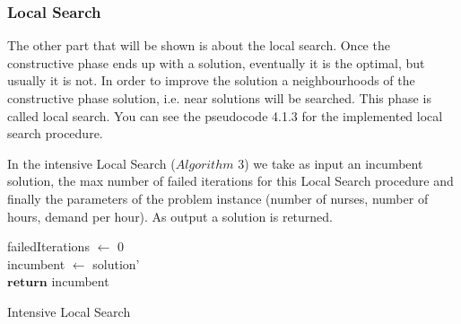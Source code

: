 \subsubsection{Local Search}

The other part that will be shown is about the local search. Once the constructive phase ends up with a solution, eventually it is the optimal, but usually it is not. In order to improve the solution a neighbourhoods of the constructive phase solution, i.e. near solutions will be searched. This phase is called local search. You can see the pseudocode 4.1.3 for the implemented local search procedure.

In the intensive Local Search ($Algorithm$ $3$) we take as input an incumbent solution, the max number of failed iterations for this Local Search procedure and finally the parameters of the problem instance (number of nurses, number of hours, demand per hour). As output a solution is returned.

\begin{algorithm}[H]


failedIterations $\leftarrow$ 0 \\
incumbent $\leftarrow$ solution'\\
$\textbf{return}$ incumbent
\caption{Intensive Local Search}\label{alg.mainLoop}
\end{algorithm}

